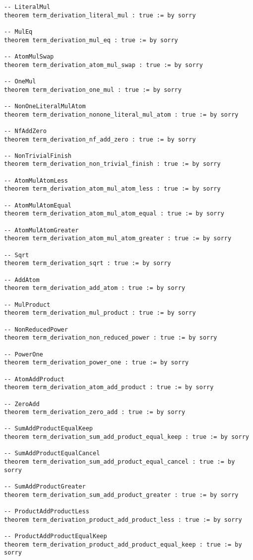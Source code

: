 \documentclass{article}
\begin{document}
\begin{tcolorbox}[colback=white!10, width=\linewidth]
\begin{lstlisting}[language=Lean4]
-- LiteralMul
theorem term_derivation_literal_mul : true := by sorry

-- MulEq
theorem term_derivation_mul_eq : true := by sorry

-- AtomMulSwap
theorem term_derivation_atom_mul_swap : true := by sorry

-- OneMul
theorem term_derivation_one_mul : true := by sorry

-- NonOneLiteralMulAtom
theorem term_derivation_nonone_literal_mul_atom : true := by sorry

-- NfAddZero
theorem term_derivation_nf_add_zero : true := by sorry

-- NonTrivialFinish
theorem term_derivation_non_trivial_finish : true := by sorry

-- AtomMulAtomLess
theorem term_derivation_atom_mul_atom_less : true := by sorry

-- AtomMulAtomEqual
theorem term_derivation_atom_mul_atom_equal : true := by sorry

-- AtomMulAtomGreater
theorem term_derivation_atom_mul_atom_greater : true := by sorry

-- Sqrt
theorem term_derivation_sqrt : true := by sorry

-- AddAtom
theorem term_derivation_add_atom : true := by sorry

-- MulProduct
theorem term_derivation_mul_product : true := by sorry

-- NonReducedPower
theorem term_derivation_non_reduced_power : true := by sorry

-- PowerOne
theorem term_derivation_power_one : true := by sorry

-- AtomAddProduct
theorem term_derivation_atom_add_product : true := by sorry

-- ZeroAdd
theorem term_derivation_zero_add : true := by sorry

-- SumAddProductEqualKeep
theorem term_derivation_sum_add_product_equal_keep : true := by sorry

-- SumAddProductEqualCancel
theorem term_derivation_sum_add_product_equal_cancel : true := by sorry

-- SumAddProductGreater
theorem term_derivation_sum_add_product_greater : true := by sorry

-- ProductAddProductLess
theorem term_derivation_product_add_product_less : true := by sorry

-- ProductAddProductEqualKeep
theorem term_derivation_product_add_product_equal_keep : true := by sorry


\end{lstlisting}
\end{tcolorbox}
\end{document}
